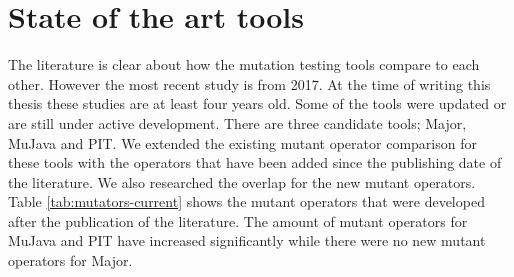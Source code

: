 \documentclass[../main]{subfiles}
\begin{document}
\section{State of the art tools}
The literature is clear about how the mutation testing tools compare to each other.
However the most recent study is from 2017.
At the time of writing this thesis these studies are at least four years old. 
Some of the tools were updated or are still under active development\cite{pit-releases,Major}.
\newline
There are three candidate tools; Major, MuJava and PIT.
We extended the existing mutant operator comparison for these tools with the operators that have been added since the publishing date of the literature.
We also researched the overlap for the new mutant operators.
Table \ref{tab:mutators-current} shows the mutant operators that were developed after the publication of the literature. The amount of mutant operators for  MuJava and PIT have increased significantly while there were no new mutant operators for Major.
\end{document}

